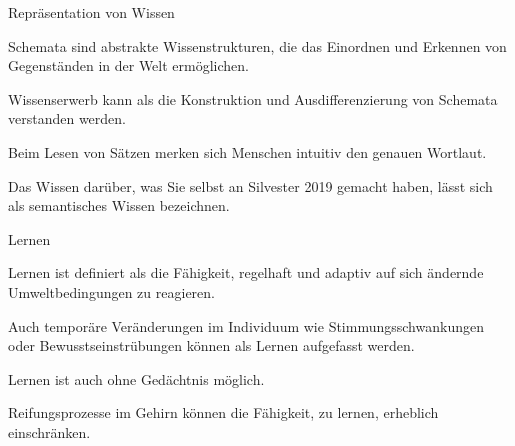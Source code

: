 \begin{multiple-choice}{Repräsentation von Wissen}
    \begin{answers}
        \item[\correct] Schemata sind abstrakte Wissenstrukturen, die das Einordnen und Erkennen von Gegenständen in der Welt ermöglichen.
        \item[\correct] Wissenserwerb kann als die Konstruktion und Ausdifferenzierung von Schemata verstanden werden.
        \item[\unsure] Beim Lesen von Sätzen merken sich Menschen intuitiv den genauen Wortlaut.
        \item[\wrong] Das Wissen darüber, was Sie selbst an Silvester 2019 gemacht haben, lässt sich als semantisches Wissen bezeichnen.
    \end{answers}
\end{multiple-choice}

\begin{multiple-choice}{Lernen}
    \begin{answers}
        \item[\correct] Lernen ist definiert als die Fähigkeit, regelhaft und adaptiv auf sich ändernde Umweltbedingungen zu reagieren.
        \item[\wrong] Auch temporäre Veränderungen im Individuum wie Stimmungsschwankungen oder Bewusstseinstrübungen können als Lernen aufgefasst werden.
        \item[\wrong] Lernen ist auch ohne Gedächtnis möglich.
        \item[\wrong] Reifungsprozesse im Gehirn können die Fähigkeit, zu lernen, erheblich einschränken.
    \end{answers}
\end{multiple-choice}

